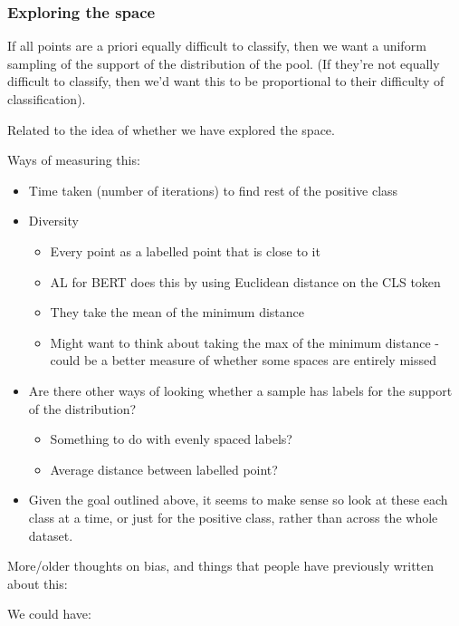 \documentclass[11pt]{article}
\begin{document}
\subsubsection{Exploring the space}

If all points are a priori equally difficult to classify, then we want a uniform sampling of the support of the distribution of the pool. (If they're not equally difficult to classify, then we'd want this to be proportional to their difficulty of classification). 

Related to the idea of whether we have explored the space.

Ways of measuring this: 

\begin{itemize}
\item Time taken (number of iterations) to find rest of the positive class  
\item Diversity 
\begin{itemize}
\item Every point as a labelled point that is close to it 
\item  AL for BERT does this by using Euclidean distance on the CLS token 
\item They take the mean of the minimum distance 
\item Might want to think about taking the max of the minimum distance - could be a better measure of whether some spaces are entirely missed 
\end{itemize}
\item Are there other ways of looking whether a sample has labels for the support of the distribution? 
\begin{itemize}
\item Something to do with evenly spaced labels? 
\item Average distance between labelled point? 
\end{itemize}
\item Given the goal outlined above, it seems to make sense so look at these each class at a time, or just for the positive class, rather than across the whole dataset. 
\end{itemize}





More/older thoughts on bias, and things that people have previously written about this: 

We could have:  
\end{document}
